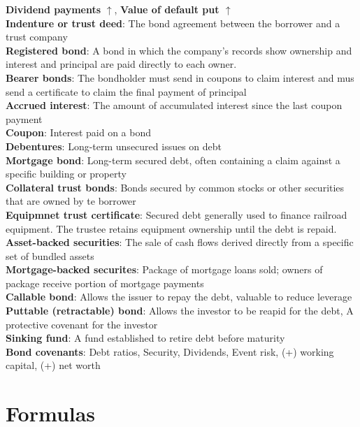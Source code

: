 \documentclass{cheatsheet}
\begin{document}
    \textbf{Dividend payments} \textbf{$\uparrow$}, \textbf{Value of default put $\uparrow$}\\
    \textbf{Indenture or trust deed}: The bond agreement between the borrower and a trust company\\
    \textbf{Registered bond}: A bond in which the company's records show ownership and interest and principal are paid directly to each owner.\\
    \textbf{Bearer bonds}: The bondholder must send in coupons to claim interest and mus send a certificate to claim the final payment of principal\\
    \textbf{Accrued interest}: The amount of accumulated interest since the last coupon payment\\
    \textbf{Coupon}: Interest paid on a bond\\
    \textbf{Debentures}: Long-term unsecured issues on debt\\
    \textbf{Mortgage bond}: Long-term secured debt, often containing a claim against a specific building or property\\
    \textbf{Collateral trust bonds}: Bonds secured by common stocks or other securities that are owned by te borrower\\
    \textbf{Equipmnet trust certificate}: Secured debt generally used to finance railroad equipment. The trustee retains equipment ownership until the debt is repaid.\\
    \textbf{Asset-backed securities}: The sale of cash flows derived directly from a specific set of bundled assets\\
    \textbf{Mortgage-backed securites}: Package of mortgage loans sold; owners of package receive portion of mortgage payments\\
    \textbf{Callable bond}: Allows the issuer to repay the debt, valuable to reduce leverage\\
    \textbf{Puttable (retractable) bond}: Allows the investor to be reapid for the debt, A protective covenant for the investor\\
    \textbf{Sinking fund}: A fund established to retire debt before maturity\\
    \textbf{Bond covenants}: Debt ratios, Security, Dividends, Event risk, (+) working capital, (+) net worth\\


\section*{Formulas}
\end{document}
